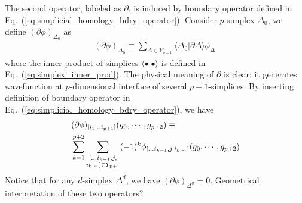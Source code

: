 \documentclass[%
 reprint,
 amsmath,amssymb,
 aps,pra,
]{revtex4-1}
\begin{document}
The second operator, labeled as $\partial$, is induced by boundary operator defined in Eq.~(\ref{eq:simplicial_homology_bdry_operator}). 
Consider $p$-simplex $\Delta_0$, we define $(\partial\phi)_{\Delta_0}$ as
\begin{align}
    (\partial\phi)_{\Delta_0}\equiv \sum_{\Delta\in Y_{p+1}}\langle\Delta_0|\partial\Delta\rangle\phi_\Delta~
\end{align}
where the inner product of simplices $\langle \bullet|\bullet\rangle$ is defined in Eq.~(\ref{eq:simplex_inner_prod}).
The physical meaning of $\partial$ is clear:
it generates wavefunction at $p$-dimensional interface of several $p+1$-simplices.
By inserting definition of boundary operator in Eq.~(\ref{eq:simplicial_homology_bdry_operator}), we have
\begin{align}
    &(\partial\phi)_{[i_1\dots i_{p+1}]}(g_0,\cdots,g_{p+2})\equiv\notag\\
    &\sum_{k=1}^{p+2}\sum_{\substack{[\dots i_{k-1},j,\\i_{k}\dots]\in Y_{p+1}}}(-1)^k\phi_{[\dots i_{k-1},j,i_{k}\dots]}(g_0,\cdots,g_{p+2})
\end{align}
Notice that for any $d$-simplex $\Delta^d$, we have $(\partial\phi)_{\Delta^d}=0$.
{\color{red} Geometrical interpretation of these two operators?}
\end{document}
